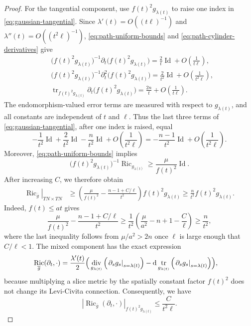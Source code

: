 \documentclass[11pt,reqno]{amsart}
\theoremstyle{definition}
\numberwithin{equation}{section}
\DeclareMathOperator{\Ric}{Ric}
\DeclareMathOperator{\tr}{tr}
\DeclareMathOperator{\divsymb}{div}
\DeclareMathOperator{\Id}{Id}
\newcommand{\dd}{\mathop{}\!\mathrm d}
\begin{document}
\begin{proof}
For the tangential component, use $f(t)^2g_{\lambda(t)}$ to raise one
index in \eqref{eq:gaussian-tangential}.  Since
$\lambda'(t)=O((t\ell)^{-1})$ and
$\lambda''(t)=O((t^2\ell)^{-1})$, 
\eqref{eq:path-uniform-bounds} and
\eqref{eq:path-cylinder-derivatives} give
\begin{align*}
 &\bigl(f(t)^2g_{\lambda(t)}\bigr)^{-1}
   \partial_t\bigl(f(t)^2g_{\lambda(t)}\bigr)
   =\frac2t\Id+O\left(\frac1{t\ell}\right),\\
 &\bigl(f(t)^2g_{\lambda(t)}\bigr)^{-1}
   \partial_t^2\bigl(f(t)^2g_{\lambda(t)}\bigr)
   =\frac2{t^2}\Id+O\left(\frac1{t^2\ell}\right),\\
 &\tr_{f(t)^2g_{\lambda(t)}}
   \partial_t\bigl(f(t)^2g_{\lambda(t)}\bigr)
   =\frac{2n}{t}+O\left(\frac1{t\ell}\right).
\end{align*}
The endomorphism-valued error terms are measured with respect to
$g_{\lambda(t)}$, and all constants are independent of $t$ and $\ell$.
Thus the last three terms of \eqref{eq:gaussian-tangential}, after one
index is raised, equal
\[
 -\frac1{t^2}\Id+\frac2{t^2}\Id-\frac n{t^2}\Id
 +O\left(\frac1{t^2\ell}\right)
 =-\frac{n-1}{t^2}\Id+O\left(\frac1{t^2\ell}\right).
\]
Moreover, \eqref{eq:path-uniform-bounds} implies
\[
 \bigl(f(t)^2g_{\lambda(t)}\bigr)^{-1}
 \Ric_{g_{\lambda(t)}}\ge\frac{\mu}{f(t)^2}\Id.
\]
After increasing $C$, we therefore obtain
\begin{align}
 \left.\Ric_{\overline g}\right|_{TN\times TN}
 &\ge\left(\frac{\mu}{f(t)^2}
       -\frac{n-1+C/\ell}{t^2}\right)f(t)^2g_{\lambda(t)}
   \ge\frac n{t^2}f(t)^2g_{\lambda(t)}.
 \label{eq:path-tangential-lower}
\end{align}
Indeed, $f(t)\le at$ gives
\[
 \frac{\mu}{f(t)^2}-\frac{n-1+C/\ell}{t^2}
 \ge\frac1{t^2}
 \left(\frac{\mu}{a^2}-n+1-\frac C\ell\right)
 \ge\frac n{t^2},
\]
where the last inequality follows from
$\mu/a^2>2n$ once $\ell$ is large enough that $C/\ell<1$.
The mixed component has the exact expression
\begin{align}
 \Ric_{\overline g}(\partial_t,\mathord\cdot)
 =\frac{\lambda'(t)}2\Bigl(&
 \divsymb_{g_{\lambda(t)}}
   \left(\left.\partial_sg_s\right|_{s=\lambda(t)}\right)-\dd\tr_{g_{\lambda(t)}}\left(\left.\partial_sg_s\right|_{s=\lambda(t)}\right)\Bigr),
 \label{eq:path-mixed-exact}
\end{align}
because multiplying a slice metric by the spatially constant factor
$f(t)^2$ does not change its Levi-Civita connection.  Consequently, we have
\begin{equation}
 |\Ric_{\overline g}(\partial_t,\mathord\cdot)|_{f(t)^2g_{\lambda(t)}}
 \le\frac{C}{t^2\ell}.
 \label{eq:path-mixed-bound}
\end{equation}


\end{proof}
\end{document}

